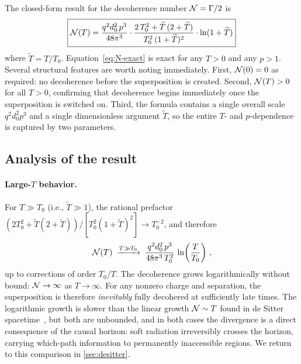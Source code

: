The closed-form result for the decoherence number $\mathcal{N} = \Gamma/2$ is
%
\begin{equation}
  \boxed{
  \mathcal{N}(T)
  =
  \frac{q^{2}d_{0}^{2}\,p^{3}}{48\pi^{3}}
  \cdot
  \frac{2\,T_{0}^{2} + \widetilde{T}\,(2 + \widetilde{T})}{T_{0}^{2}\,(1 + \widetilde{T})^{2}}
  \cdot
  \ln(1 + \widetilde{T})
  }
  \label{eq:N-exact}
\end{equation}
%
where $\widetilde{T} = T/T_{0}$.  Equation~\eqref{eq:N-exact} is exact for any
$T > 0$ and any $p > 1$.  Several structural features are worth noting
immediately.  First, $\mathcal{N}(0) = 0$ as required: no decoherence before the
superposition is created.  Second, $\mathcal{N}(T) > 0$ for all $T > 0$, confirming
that decoherence begins immediately once the superposition is switched on.
Third, the formula contains a single overall scale $q^{2}d_{0}^{2}p^{3}$ and a
single dimensionless argument $\widetilde{T}$, so the entire $T$- and
$p$-dependence is captured by two parameters.

\subsection{Analysis of the result}
\label{sec:powerlaw-analysis}

\paragraph{Large-$T$ behavior.}
For $T \gg T_{0}$ (i.e., $\widetilde{T} \gg 1$), the rational prefactor
$(2T_{0}^{2} + \widetilde{T}(2+\widetilde{T}))/[T_{0}^{2}(1+\widetilde{T})^{2}]
\to T_{0}^{-2}$, and therefore
%
\begin{equation}
  \mathcal{N}(T)
  \;\xrightarrow{T \gg T_{0}}\;
  \frac{q^{2}d_{0}^{2}\,p^{3}}{48\pi^{3}\,T_{0}^{2}}
  \,\ln\!\left(\frac{T}{T_{0}}\right) \,,
  \label{eq:N-large-T}
\end{equation}
%
up to corrections of order $T_{0}/T$.  The decoherence grows logarithmically
without bound: $\mathcal{N} \to \infty$ as $T \to \infty$.  For any nonzero charge and
separation, the superposition is therefore \emph{inevitably} fully decohered
at sufficiently late times.  The logarithmic growth is slower than the linear
growth $\mathcal{N} \sim T$ found in de Sitter spacetime~\cite{Danielson:2022tdw}, but
both are unbounded, and in both cases the divergence is a direct consequence of the
causal horizon: soft radiation irreversibly crosses the horizon, carrying
which-path information to permanently inaccessible regions.  We return to this
comparison in \cref{sec:desitter}.

